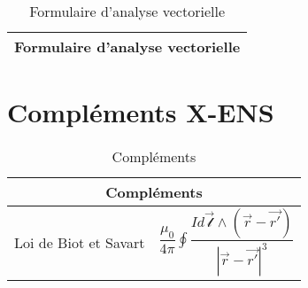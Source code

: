 \documentclass[10pt,a4paper,titlepage,landscape]{article}
\renewcommand{\arraystretch}{2}
\begin{document}
\begin{table}[H]
    \centering
    \renewcommand{\arraystretch}{1.5} %
    \setlength{\tabcolsep}{8pt} %
    \begin{tabular}{@{}|p{9cm}|p{10cm}@{}|}
        \multicolumn{2}{c}{\textbf{Formulaire d'analyse vectorielle}} \\ \hline
        
\end{tabular}
\caption{Formulaire d'analyse vectorielle}
\label{tab:anavec}
\end{table}


\section{Compléments X-ENS}


\begin{table}[H]
    \centering
    \renewcommand{\arraystretch}{1.5} %
    \setlength{\tabcolsep}{8pt} %
    \begin{tabular}{@{}|p{9cm}|p{10cm}@{}|}
        \multicolumn{2}{c}{\textbf{Compléments}} \\ \hline
        Loi de Biot et Savart & $\displaystyle\dfrac{\mu_0}{4\pi}\oint\dfrac{Id\vec{\mathscr{l}} \wedge (\vec{r} - \vec{r'})}{|\vec{r} -\vec{r'}|^3}$ \\ \hline
\end{tabular}
\caption{Compléments}
\label{tab:xens}
\end{table}
\end{document}

